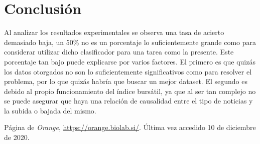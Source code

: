 \documentclass[11pt]{article}
\begin{document}
\section{Conclusión}
Al analizar los resultados experimentales se observa una tasa de acierto demasiado baja, un 50\% no es un porcentaje lo suficientemente grande como para considerar utilizar dicho clasificador para una tarea como la presente. Este porcentaje tan bajo puede explicarse por varios factores. El primero es que quizás los datos otorgados no son lo suficientemente significativos como para resolver el problema, por lo que quizás habría que buscar un mejor dataset. El segundo es debido al propio funcionamiento del índice bursátil, ya que al ser tan complejo no se puede asegurar que haya una relación de causalidad entre el tipo de noticias y la subida o bajada del mismo.
\begin{thebibliography}{8}
Página de \textit{Orange}, \url{https://orange.biolab.si/}. Última vez accedido 10 de diciembre de 2020.        
\end{thebibliography}
\end{document}
